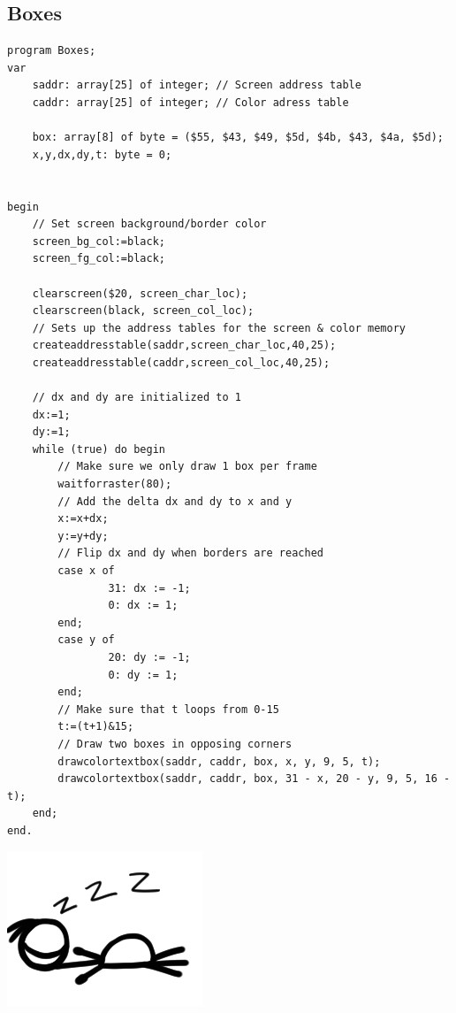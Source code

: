 \subsection{Boxes}
\begin{minipage}{0.8\textwidth}
\begin{lstlisting}
program Boxes;
var  
	saddr: array[25] of integer; // Screen address table
	caddr: array[25] of integer; // Color adress table
	
	box: array[8] of byte = ($55, $43, $49, $5d, $4b, $43, $4a, $5d);
	x,y,dx,dy,t: byte = 0;

	
begin
	// Set screen background/border color
	screen_bg_col:=black;
	screen_fg_col:=black;
	
    clearscreen($20, screen_char_loc);
    clearscreen(black, screen_col_loc);
	// Sets up the address tables for the screen & color memory    
	createaddresstable(saddr,screen_char_loc,40,25);
	createaddresstable(caddr,screen_col_loc,40,25);

	// dx and dy are initialized to 1
	dx:=1;
	dy:=1;
	while (true) do begin
		// Make sure we only draw 1 box per frame
		waitforraster(80);
		// Add the delta dx and dy to x and y
		x:=x+dx;
		y:=y+dy;
		// Flip dx and dy when borders are reached
	    case x of
		    	31: dx := -1;
		    	0: dx := 1;
		end;
	    case y of
	    		20: dy := -1;
	    		0: dy := 1;
		end;
		// Make sure that t loops from 0-15
		t:=(t+1)&15;
		// Draw two boxes in opposing corners
		drawcolortextbox(saddr, caddr, box, x, y, 9, 5, t);
		drawcolortextbox(saddr, caddr, box, 31 - x, 20 - y, 9, 5, 16 - t);
	end;
end.\end{lstlisting}
\end{minipage}
\begin{minipage}{0.2\textwidth}
\includegraphics[width=\linewidth]{images/trip/trip10.png}
\end{minipage}

